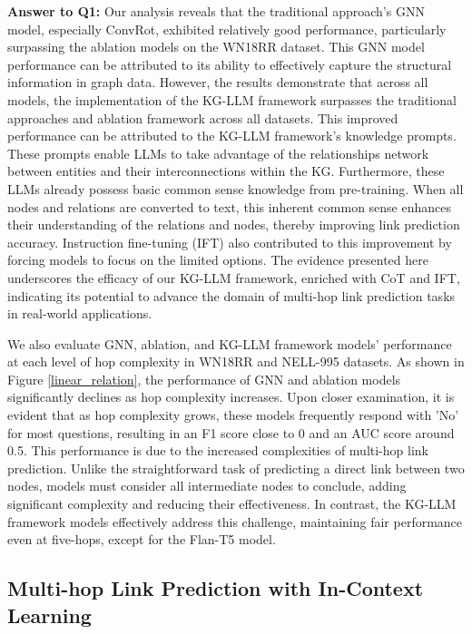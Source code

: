 \documentclass[pmlr]{jmlr}%
\begin{document}
\noindent
\textbf{Answer to Q1:} Our analysis reveals that the traditional approach's GNN model, especially ConvRot, exhibited relatively good performance, particularly surpassing the ablation models on the WN18RR dataset. This GNN model performance can be attributed to its ability to effectively capture the structural information in graph data. However, the results demonstrate that across all models, the implementation of the KG-LLM framework surpasses the traditional approaches and ablation framework across all datasets. This improved performance can be attributed to the KG-LLM framework's knowledge prompts. These prompts enable LLMs to take advantage of the relationships network between entities and their interconnections within the KG. Furthermore, these LLMs already possess basic common sense knowledge from pre-training. When all nodes and relations are converted to text, this inherent common sense enhances their understanding of the relations and nodes, thereby improving link prediction accuracy. Instruction fine-tuning (IFT) also contributed to this improvement by forcing models to focus on the limited options. The evidence presented here underscores the efficacy of our KG-LLM framework, enriched with CoT and IFT, indicating its potential to advance the domain of multi-hop link prediction tasks in real-world applications.


We also evaluate GNN, ablation, and KG-LLM framework models' performance at each level of hop complexity in WN18RR and NELL-995 datasets. As shown in Figure \ref{linear_relation}, the performance of GNN and ablation models significantly declines as hop complexity increases. Upon closer examination, it is evident that as hop complexity grows, these models frequently respond with 'No' for most questions, resulting in an F1 score close to 0 and an AUC score around 0.5. This performance is due to the increased complexities of multi-hop link prediction. Unlike the straightforward task of predicting a direct link between two nodes, models must consider all intermediate nodes to conclude, adding significant complexity and reducing their effectiveness. In contrast, the KG-LLM framework models effectively address this challenge, maintaining fair performance even at five-hops, except for the Flan-T5 model.

\subsection{Multi-hop Link Prediction with In-Context Learning}
\end{document}
